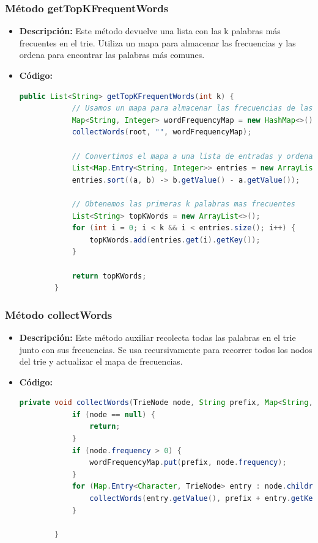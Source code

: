 \documentclass{article}
\begin{document}
  
  \subsubsection{Método getTopKFrequentWords}
  \begin{itemize}
    \item \textbf{Descripción: }Este método devuelve una lista con las k palabras más frecuentes en el trie. Utiliza un mapa para almacenar las frecuencias y 
    las ordena para encontrar las palabras más comunes.
    \item \textbf{Código: }
    \begin{lstlisting}[language=Java, caption={Método getTopKFrequentWords}]
        public List<String> getTopKFrequentWords(int k) {
            // Usamos un mapa para almacenar las frecuencias de las palabras
            Map<String, Integer> wordFrequencyMap = new HashMap<>();
            collectWords(root, "", wordFrequencyMap);

            // Convertimos el mapa a una lista de entradas y ordenamos por frecuencia
            List<Map.Entry<String, Integer>> entries = new ArrayList<>(wordFrequencyMap.entrySet());
            entries.sort((a, b) -> b.getValue() - a.getValue());

            // Obtenemos las primeras k palabras mas frecuentes
            List<String> topKWords = new ArrayList<>();
            for (int i = 0; i < k && i < entries.size(); i++) {
                topKWords.add(entries.get(i).getKey());
            }

            return topKWords;
        }
    \end{lstlisting}
  \end{itemize}
  
  
  \subsubsection{Método collectWords}
  \begin{itemize}
    \item \textbf{Descripción: } Este método auxiliar recolecta todas las palabras en el trie junto con sus frecuencias. Se usa recursivamente para recorrer todos los nodos del trie y 
    actualizar el mapa de frecuencias.
    \item \textbf{Código: }
    \begin{lstlisting}[language=Java, caption={Método collectWords}]
        private void collectWords(TrieNode node, String prefix, Map<String, Integer> wordFrequencyMap) {
            if (node == null) {
                return;
            }
            if (node.frequency > 0) {
                wordFrequencyMap.put(prefix, node.frequency);
            }
            for (Map.Entry<Character, TrieNode> entry : node.children.entrySet()) {
                collectWords(entry.getValue(), prefix + entry.getKey(), wordFrequencyMap);
            }
            
        }
    \end{lstlisting}
  \end{itemize}
  
\end{document}
